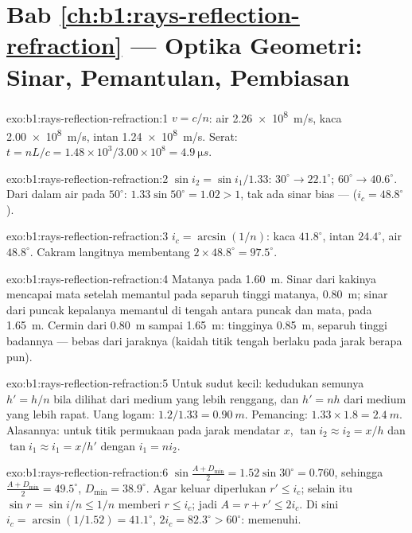 \section*{Bab \ref{ch:b1:rays-reflection-refraction} --- Optika Geometri: Sinar, Pemantulan, Pembiasan}

\begin{solution}{exo:b1:rays-reflection-refraction:1}
$v = c/n$: air \qty{2.26e8}{m/s}, kaca \qty{2.00e8}{m/s}, intan
\qty{1.24e8}{m/s}. Serat: $t = nL/c = 1.48 \times 10^3/3.00\times10^8 =
\qty{4.9}{\micro s}$.
\end{solution}

\begin{solution}{exo:b1:rays-reflection-refraction:2}
$\sin i_2 = \sin i_1/1.33$: $30^\circ \to 22.1^\circ$; $60^\circ \to
40.6^\circ$. Dari dalam air pada $50^\circ$: $1.33\sin 50^\circ = 1.02 > 1$,
tak ada sinar bias ---  ($i_c = 48.8^\circ$).
\end{solution}

\begin{solution}{exo:b1:rays-reflection-refraction:3}
$i_c = \arcsin(1/n)$: kaca $41.8^\circ$, intan $24.4^\circ$, air
$48.8^\circ$. Cakram langitnya membentang $2 \times 48.8^\circ = 97.5^\circ$.
\end{solution}

\begin{solution}{exo:b1:rays-reflection-refraction:4}
Matanya pada \qty{1.60}{m}. Sinar dari kakinya mencapai mata setelah
memantul pada separuh tinggi matanya, \qty{0.80}{m}; sinar dari puncak
kepalanya memantul di tengah antara puncak dan mata, pada \qty{1.65}{m}.
Cermin dari \qty{0.80}{m} sampai \qty{1.65}{m}: tingginya \qty{0.85}{m},
separuh tinggi badannya --- bebas dari jaraknya (kaidah titik tengah
berlaku pada jarak berapa pun).
\end{solution}

\begin{solution}{exo:b1:rays-reflection-refraction:5}
Untuk sudut kecil: kedudukan semunya $h' = h/n$ bila dilihat dari medium
yang lebih renggang, dan $h' = nh$ dari medium yang lebih rapat. Uang
logam: $1.2/1.33 =
\qty{0.90}{m}$. Pemancing: $1.33 \times 1.8 = \qty{2.4}{m}$. Alasannya:
untuk titik permukaan pada jarak mendatar $x$, $\tan i_2 \approx i_2 =
x/h$ dan $\tan i_1 \approx i_1 = x/h'$ dengan $i_1 = n i_2$.
\end{solution}

\begin{solution}{exo:b1:rays-reflection-refraction:6}
$\sin\frac{A + D_{\min}}{2} = 1.52\sin 30^\circ = 0.760$, sehingga
$\frac{A + D_{\min}}{2} = 49.5^\circ$, $D_{\min} = 38.9^\circ$.
Agar keluar diperlukan $r' \leq i_c$; selain itu $\sin r = \sin i/n \leq 1/n$ memberi
$r \leq i_c$; jadi $A = r + r' \leq 2i_c$. Di sini $i_c = \arcsin(1/1.52) =
41.1^\circ$, $2i_c = 82.3^\circ > 60^\circ$: memenuhi.
\end{solution}

